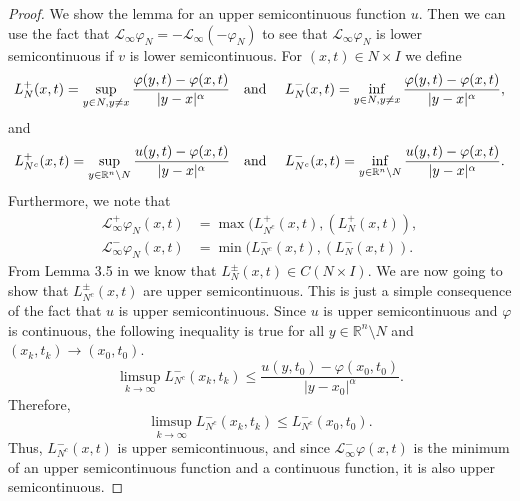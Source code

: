 \documentclass[11pt]{article}
\providecommand{\Linf}{\mathcal{L}_{\infty}}
\providecommand{\Lpos}{\mathcal{L}_{\infty}^+}
\providecommand{\Lneg}{\mathcal{L}_{\infty}^-}
\providecommand{\Rn}{\mathbb{R}^n}
\providecommand{\Ns}{N \times I}
\numberwithin{equation}{section}
\theoremstyle{definition}
\begin{document}
\begin{proof}
    We show the lemma for an upper semicontinuous function $u$. Then we can use the fact that $\Linf \varphi_{N} = - \Linf (-\varphi_{N})$ to see that $\Linf \varphi_{N}$ is lower semicontinuous if $v$ is lower semicontinuous. For $(x,t) \in \Ns$ we define
    \begin{equation*}
        L^+_{N}(x,t) = \sup_{y \in N, y\neq x} \frac{\varphi(y,t)-\varphi(x,t)}{|y-x|^{\alpha}} \quad \textup{and } \quad L^-_{N}(x,t) = \inf_{y \in N, y\neq x} \frac{\varphi(y,t)-\varphi(x,t)}{|y-x|^{\alpha}},
    \end{equation*}
and
    \begin{equation*}
        L^+_{N^c}(x,t) = \sup_{y \in \Rn \setminus N} \frac{u(y,t)-\varphi(x,t)}{|y-x|^{\alpha}} \quad \textup{and } \quad L^-_{N^c}(x,t) = \inf_{y \in \Rn \setminus N} \frac{u(y,t)-\varphi(x,t)}{|y-x|^{\alpha}}.
    \end{equation*}
    Furthermore, we note that
    \begin{align*}
        \Lpos \varphi_{N}(x,t) &= \max(L^+_{N^c}(x,t), (L^+_{N}(x,t)), \\
        \Lneg \varphi_{N}(x,t) &= \min(L^-_{N^c}(x,t), (L^-_{N}(x,t)). 
    \end{align*}
From Lemma 3.5 in \cite{CLM2012} we know that $L^{\pm}_{N}(x,t) \in C(\Ns)$. We are now going to show that $L^{\pm}_{N^c}(x,t)$ are upper semicontinuous. This is just a simple consequence of the fact that $u$ is upper semicontinuous. Since $u$ is upper semicontinuous and $\varphi$ is continuous, the following inequality is true for all $y \in \Rn \setminus N$ and $(x_k,t_k) \to (x_0,t_0)$.
\begin{equation*}
    \limsup_{k \to \infty} L^-_{N^c}(x_k,t_k) \leq \frac{u(y,t_0)-\varphi(x_0,t_0)}{|y-x_0|^{\alpha}}.
\end{equation*}
Therefore,
\begin{equation*}\label{eq:notinfty}
    \limsup_{k \to \infty} L^-_{N^c}(x_k,t_k) \leq L^-_{N^c}(x_0,t_0).
    \end{equation*}
 Thus, $L^-_{N^c}(x,t)$ is upper semicontinuous, and since $\Lneg \varphi(x,t)$ is the minimum of an upper semicontinuous function and a continuous function, it is also upper semicontinuous. 


\end{proof}
\end{document}
